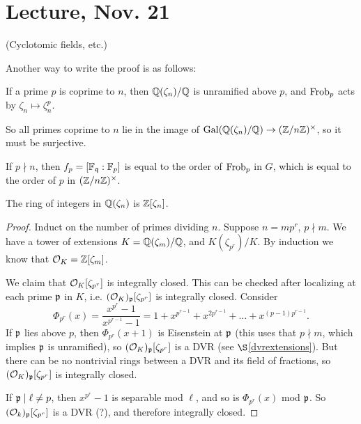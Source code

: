 \documentclass[11pt]{amsart}
\begin{document}
\section{Lecture, Nov. 21}

(Cyclotomic fields, etc.)

Another way to write the proof is as follows:

\begin{prop}
    If a prime $p$ is coprime to $n$, then $\mathbb{Q}(\zeta_n)/\mathbb{Q}$ is unramified above $p$, and $\operatorname{Frob}_p$ acts by $\zeta_n\mapsto \zeta_n^p$.
\end{prop}

So all primes coprime to $n$ lie in the image of $\operatorname{Gal}(\mathbb{Q}(\zeta_n)/\mathbb{Q})\to (\mathbb{Z}/n\mathbb{Z})^{\times}$, so it must be surjective.

\begin{cor}
    If $p\nmid n$, then $f_p = [\mathbb{F}_{\mathfrak{q}}:\mathbb{F}_p]$ is equal to the order of $\operatorname{Frob}_p$ in $G$, which is equal to the order of $p$ in $(\mathbb{Z}/n\mathbb{Z})^{\times}$.
\end{cor}


\begin{prop}
    The ring of integers in $\mathbb{Q}(\zeta_n)$ is $\mathbb{Z}[\zeta_n]$.
\end{prop}

\begin{proof}
    Induct on the number of primes dividing $n$. Suppose $n = mp^r$, $p\nmid m$. We have a tower of extensions $K = \mathbb{Q}(\zeta_m)/\mathbb{Q}$, and $K(\zeta_{p^r})/K$. By induction we know that $\mathcal{O}_K = \mathbb{Z}[\zeta_m]$.

    We claim that $\mathcal{O}_K[\zeta_{p^r}]$ is integrally closed. This can be checked after localizing at each prime $\mathfrak{p}$ in $K$, i.e. $(\mathcal{O}_K)_{\mathfrak{p}}[\zeta_{p^r}]$ is integrally closed. Consider
    \[\Phi_{p^r}(x) = \frac{x^{p^r}-1}{x^{p^{r-1}}-1} = 1 + x^{p^{r-1}} + x^{2p^{r-1}} + \dots + x^{(p-1)p^{r-1}}.\]
    If $\mathfrak{p}$ lies above $p$, then $\Phi_{p^r}(x+1)$ is Eisenstein at $\mathfrak{p}$ (this uses that $p\nmid m$, which implies $\mathfrak{p}$ is unramified), so $(\mathcal{O}_K)_{\mathfrak{p}}[\zeta_{p^r}]$ is a DVR (see $\S$\ref{dvrextensions}). But there can be no nontrivial rings between a DVR and its field of fractions, so $(\mathcal{O}_K)_{\mathfrak{p}}[\zeta_{p^r}]$ is integrally closed.

    If $\mathfrak{p}\mid\ell\neq p$, then $x^{p^r}-1$ is separable mod $\ell$, and so is $\Phi_{p^r}(x)$ mod $\mathfrak{p}$. So $(\mathcal{O}_k)_{\mathfrak{p}}[\zeta_{p^r}]$ is a DVR (?), and therefore integrally closed.
\end{proof}
\end{document}
